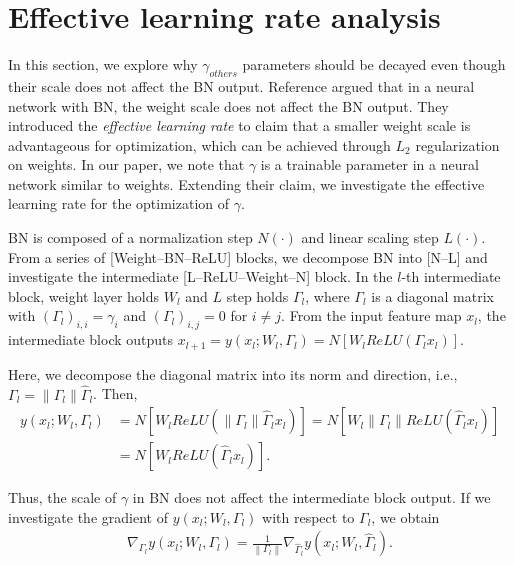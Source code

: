 \documentclass{article}
\begin{document}
\section{Effective learning rate analysis}
\label{sec:effectivelearningrateanalysis}
In this section, we explore why $\gamma_{others}$ parameters should be decayed even though their scale does not affect the BN output. Reference \cite{gcorr/Laarhoven17b,gnips/HofferBGS18,giclr/ZhangWXG19} argued that in a neural network with BN, the weight scale does not affect the BN output. They introduced the \emph{effective learning rate} to claim that a smaller weight scale is advantageous for optimization, which can be achieved through $L_2$ regularization on weights. In our paper, we note that $\gamma$ is a trainable parameter in a neural network similar to weights. Extending their claim, we investigate the effective learning rate for the optimization of $\gamma$.

BN is composed of a normalization step $N(\cdot)$ and linear scaling step $L(\cdot)$. From a series of [Weight--BN--ReLU] blocks, we decompose BN into [N--L] and investigate the intermediate [L--ReLU--Weight--N] block. In the $l$-th intermediate block, weight layer holds $W_l$ and $L$ step holds $\Gamma_l$, where $\Gamma_l$ is a diagonal matrix with $(\Gamma_l)_{i,i}=\gamma_i$ and $(\Gamma_l)_{i,j}=0$ for $i \neq j$. From the input feature map $x_l$, the intermediate block outputs $x_{l+1} = y(x_l ; W_l, \Gamma_l) = N[W_l ReLU(\Gamma_l x_l)]$.

Here, we decompose the diagonal matrix into its norm and direction, i.e., $\Gamma_l = \left\lVert \Gamma_l \right\rVert \hat{\Gamma}_l$. Then,
\begin{align}
	y(x_l ; W_l, \Gamma_l) & = N[W_l ReLU(\left\lVert \Gamma_l \right\rVert \hat{\Gamma}_l x_l)] = N[W_l \left\lVert \Gamma_l \right\rVert ReLU(\hat{\Gamma}_l x_l)] \\
	                       & = N[W_l ReLU(\hat{\Gamma}_l x_l)].
\end{align}

Thus, the scale of $\gamma$ in BN does not affect the intermediate block output. If we investigate the gradient of $y(x_l ; W_l, \Gamma_l)$ with respect to $\Gamma_l$, we obtain
\begin{align}
	\nabla_{\Gamma_l} y(x_l ; W_l, \Gamma_l) = \frac{1}{\left\lVert \Gamma_l \right\rVert} \nabla_{\hat{\Gamma}_l} y(x_l ; W_l, \hat{\Gamma}_l). \label{eq:grad_scale}
\end{align}
\end{document}
